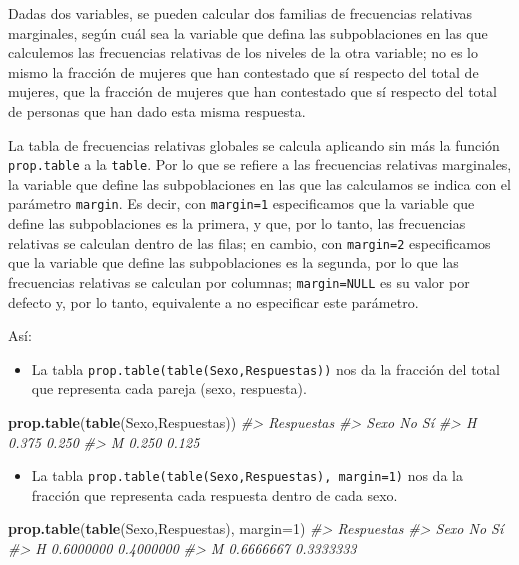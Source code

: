 \documentclass[
]{book}
\newenvironment{Shaded}{\begin{snugshade}}{\end{snugshade}}
\newcommand{\CommentTok}[1]{\textcolor[rgb]{0.56,0.35,0.01}{\textit{#1}}}
\newcommand{\DataTypeTok}[1]{\textcolor[rgb]{0.13,0.29,0.53}{#1}}
\newcommand{\DecValTok}[1]{\textcolor[rgb]{0.00,0.00,0.81}{#1}}
\newcommand{\KeywordTok}[1]{\textcolor[rgb]{0.13,0.29,0.53}{\textbf{#1}}}
\newcommand{\NormalTok}[1]{#1}
\providecommand{\tightlist}{%
  \setlength{\itemsep}{0pt}\setlength{\parskip}{0pt}}
\theoremstyle{definition}
\theoremstyle{definition}
\theoremstyle{definition}
\theoremstyle{remark}
\begin{document}
Dadas dos variables, se pueden calcular dos familias de frecuencias relativas marginales, según cuál sea la variable que defina las subpoblaciones en las que calculemos las frecuencias relativas de los niveles de la otra variable; no es lo mismo la fracción de mujeres que han contestado que sí respecto del total de mujeres, que la fracción de mujeres que han contestado que sí respecto del total de personas que han dado esta misma respuesta.

La tabla de frecuencias relativas globales se calcula aplicando sin más la función \texttt{prop.table} a la \texttt{table}.
Por lo que se refiere a las frecuencias relativas marginales, la variable que define las subpoblaciones en las que las calculamos se indica con el parámetro \texttt{margin}. Es decir, con \texttt{margin=1} especificamos que la variable que define las subpoblaciones es la primera, y que, por lo tanto, las frecuencias relativas se calculan dentro de las filas; en cambio, con \texttt{margin=2} especificamos que la variable que define las subpoblaciones es la segunda, por lo que las frecuencias relativas se calculan por columnas; \texttt{margin=NULL} es su valor por defecto y, por lo tanto, equivalente a no especificar este parámetro.

Así:

\begin{itemize}
\tightlist
\item
  La tabla \texttt{prop.table(table(Sexo,Respuestas))} nos da la fracción del total que representa cada pareja (sexo, respuesta).
\end{itemize}

\begin{Shaded}
\begin{Highlighting}[]
\KeywordTok{prop.table}\NormalTok{(}\KeywordTok{table}\NormalTok{(Sexo,Respuestas))}
\CommentTok{\#\textgreater{}     Respuestas}
\CommentTok{\#\textgreater{} Sexo    No    Sí}
\CommentTok{\#\textgreater{}    H 0.375 0.250}
\CommentTok{\#\textgreater{}    M 0.250 0.125}
\end{Highlighting}
\end{Shaded}

\begin{itemize}
\tightlist
\item
  La tabla \texttt{prop.table(table(Sexo,Respuestas),\ margin=1)} nos da la fracción que representa cada respuesta dentro de cada sexo.
\end{itemize}

\begin{Shaded}
\begin{Highlighting}[]
\KeywordTok{prop.table}\NormalTok{(}\KeywordTok{table}\NormalTok{(Sexo,Respuestas), }\DataTypeTok{margin=}\DecValTok{1}\NormalTok{)}
\CommentTok{\#\textgreater{}     Respuestas}
\CommentTok{\#\textgreater{} Sexo        No        Sí}
\CommentTok{\#\textgreater{}    H 0.6000000 0.4000000}
\CommentTok{\#\textgreater{}    M 0.6666667 0.3333333}
\end{Highlighting}
\end{Shaded}
\end{document}
